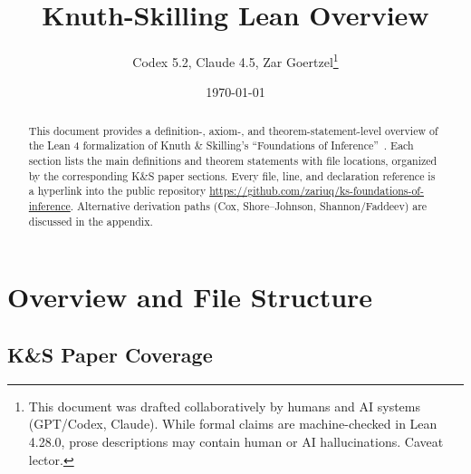 \documentclass[11pt]{article}
\title{Knuth-Skilling Lean Overview}
\author{Codex 5.2, Claude 4.5, Zar Goertzel\thanks{This document was drafted collaboratively by humans and AI systems (GPT/Codex, Claude). While formal claims are machine-checked in Lean 4.28.0, prose descriptions may contain human or AI hallucinations. Caveat lector.}}
\date{\today}
\theoremstyle{definition}
\theoremstyle{remark}
\begin{document}
\maketitle

\begin{abstract}
This document provides a definition-, axiom-, and theorem-statement-level overview of the
Lean 4 formalization of Knuth \& Skilling's ``Foundations of Inference''~\cite{KnuthSkilling2012}.
Each section lists the main definitions and theorem statements with file locations, organized
by the corresponding K\&S paper sections. Every file, line, and declaration reference is a hyperlink into the
public repository \url{https://github.com/zariuq/ks-foundations-of-inference}.
Alternative derivation paths (Cox, Shore--Johnson, Shannon/Faddeev) are discussed in the appendix.
\end{abstract}

\tableofcontents

\newpage

\section{Overview and File Structure}

\subsection{K\&S Paper Coverage}
\end{document}
